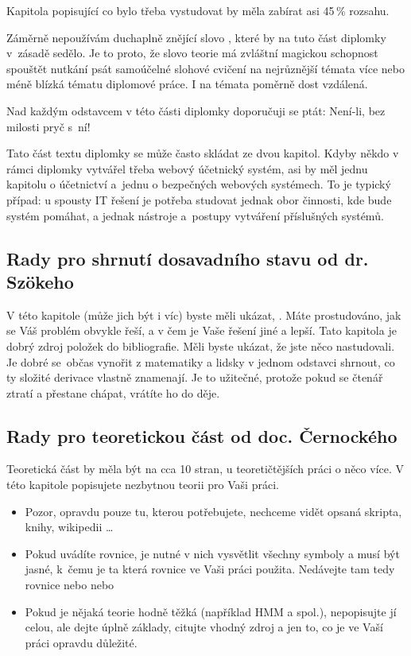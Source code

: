 Kapitola popisující co bylo třeba vystudovat by měla zabírat asi 45\,\% rozsahu.

Záměrně nepoužívám duchaplně znějící slovo , které by na tuto část diplomky v~zásadě sedělo. Je to proto, že slovo teorie má zvláštní magickou schopnost spouštět nutkání psát samoúčelné slohové cvičení na nejrůznější témata více nebo méně blízká tématu diplomové práce. I na témata poměrně dost vzdálená.

Nad každým odstavcem v této části diplomky doporučuji se ptát:  Není-li, bez milosti pryč s~ní!

Tato část textu diplomky se může často skládat ze dvou kapitol. Kdyby někdo v rámci diplomky vytvářel třeba webový účetnický systém, asi by měl jednu kapitolu o účetnictví a~jednu o bezpečných webových systémech. To je typický případ: u spousty IT řešení je potřeba studovat jednak obor činnosti, kde bude systém pomáhat, a jednak nástroje a~postupy vytváření příslušných systémů.

\subsection*{Rady pro shrnutí dosavadního stavu od dr. Szökeho}

V této kapitole (může jich být i víc) byste měli ukázat, . Máte prostudováno, jak se Váš problém obvykle řeší, a v čem je Vaše řešení jiné a lepší. Tato kapitola je dobrý zdroj položek do bibliografie. Měli byste ukázat, že jste něco nastudovali. Je dobré se~občas vynořit z matematiky a lidsky v jednom odstavci shrnout, co ty složité derivace vlastně znamenají. Je to užitečné, protože pokud se čtenář ztratí a přestane chápat, vrátíte ho do děje.

\subsection*{Rady pro teoretickou část od doc. Černockého}

Teoretická část by měla být na cca 10 stran, u teoretičtějších práci o něco více.
V této kapitole popisujete nezbytnou teorii pro Vaši práci.
\begin{itemize}
  \item{Pozor, opravdu pouze tu, kterou potřebujete, nechceme vidět opsaná skripta, knihy, wikipedii \ldots}
  \item{Pokud uvádíte rovnice, je nutné v nich vysvětlit všechny symboly a musí být jasné, k~čemu je ta která rovnice ve Vaši práci použita. Nedávejte tam tedy rovnice  nebo  nebo }
  \item{Pokud je nějaká teorie hodně těžká (například HMM a spol.), nepopisujte jí celou, ale dejte úplně základy, citujte vhodný zdroj a  jen to, co je ve Vaší práci opravdu důležité.}
\end{itemize}


